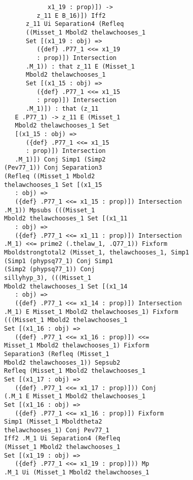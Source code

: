 \documentclass[12pt]{article}
\begin{document}
\begin{verbatim}
                         x1_19 : prop)]) -> 
                      z_11 E B_16)]) Iff2 
                   z_11 Ui Separation4 (Refleq 
                   ((Misset_1 Mbold2 thelawchooses_1 
                   Set [(x1_19 : obj) => 
                      ({def} .P77_1 <<= x1_19 
                      : prop)]) Intersection 
                   .M_1)) : that z_11 E (Misset_1 
                   Mbold2 thelawchooses_1 
                   Set [(x1_15 : obj) => 
                      ({def} .P77_1 <<= x1_15 
                      : prop)]) Intersection 
                   .M_1)]) : that (z_11 
                E .P77_1) -> z_11 E (Misset_1 
                Mbold2 thelawchooses_1 Set 
                [(x1_15 : obj) => 
                   ({def} .P77_1 <<= x1_15 
                   : prop)]) Intersection 
                .M_1)]) Conj Simp1 (Simp2 
             (Pev77_1)) Conj Separation3 
             (Refleq ((Misset_1 Mbold2 
             thelawchooses_1 Set [(x1_15 
                : obj) => 
                ({def} .P77_1 <<= x1_15 : prop)]) Intersection 
             .M_1)) Mpsubs (((Misset_1 
             Mbold2 thelawchooses_1 Set [(x1_11 
                : obj) => 
                ({def} .P77_1 <<= x1_11 : prop)]) Intersection 
             .M_1) <<= prime2 (.thelaw_1, .Q77_1)) Fixform 
             Mboldstrongtotal2 (Misset_1, thelawchooses_1, Simp1 
             (Simp1 (phypsq77_1) Conj Simp1 
             (Simp2 (phypsq77_1)) Conj 
             sillyhyp_3), (((Misset_1 
             Mbold2 thelawchooses_1 Set [(x1_14 
                : obj) => 
                ({def} .P77_1 <<= x1_14 : prop)]) Intersection 
             .M_1) E Misset_1 Mbold2 thelawchooses_1) Fixform 
             (((Misset_1 Mbold2 thelawchooses_1 
             Set [(x1_16 : obj) => 
                ({def} .P77_1 <<= x1_16 : prop)]) <<= 
             Misset_1 Mbold2 thelawchooses_1) Fixform 
             Separation3 (Refleq (Misset_1 
             Mbold2 thelawchooses_1)) Sepsub2 
             Refleq (Misset_1 Mbold2 thelawchooses_1 
             Set [(x1_17 : obj) => 
                ({def} .P77_1 <<= x1_17 : prop)])) Conj 
             (.M_1 E Misset_1 Mbold2 thelawchooses_1 
             Set [(x1_16 : obj) => 
                ({def} .P77_1 <<= x1_16 : prop)]) Fixform 
             Simp1 (Misset_1 Mboldtheta2 
             thelawchooses_1) Conj Pev77_1 
             Iff2 .M_1 Ui Separation4 (Refleq 
             (Misset_1 Mbold2 thelawchooses_1 
             Set [(x1_19 : obj) => 
                ({def} .P77_1 <<= x1_19 : prop)])) Mp 
             .M_1 Ui (Misset_1 Mbold2 thelawchooses_1 

\end{verbatim}
\end{document}
